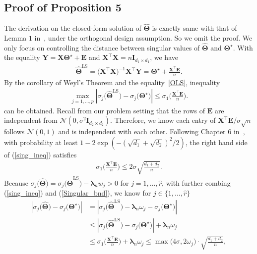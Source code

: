 \documentclass[alpha-refs]{wiley-article}
\begin{document}
\subsection{Proof of Proposition 5}
The derivation on the closed-form solution of $\widehat{\boldsymbol{\Theta}}$ is exactly same with that of Lemma $1$ in~\citet{yuan2007dimension}, under the orthogonal design assumption.
So we omit the proof.
We only focus on controlling the distance between singular values of $\widehat{\boldsymbol{\Theta}}$ and $\boldsymbol{\Theta}^{\star}$.
With the equality $\boldsymbol{Y}=\boldsymbol{X}\boldsymbol{\Theta}^{\star}+\boldsymbol{E}$ and $\boldsymbol{X}^{\top}\boldsymbol{X}=n\boldsymbol{I}_{d_{1} \times d_{1}}$, we have
\begin{align} \label{OLS}
    \widehat{\boldsymbol{\Theta}}^{\text{LS}}=\big(\boldsymbol{X}^{\top}\boldsymbol{X}\big)^{-1}\boldsymbol{X}^{\top}\boldsymbol{Y} = \boldsymbol{\Theta^\star} + \frac{\boldsymbol{X}^{\top}\boldsymbol{E}}{n}.
\end{align}
By the corollary of Weyl's Theorem and the equality~\eqref{OLS}, inequality
\begin{align} \label{sing_ineq}
    \max_{j=1,\dots,p}\left| \sigma_{j}\big(\widehat{\boldsymbol{\Theta}}^{\text{LS}}\big) - \sigma_{j}\big(\boldsymbol{\Theta^\star}\big) \right|
    \leq \sigma_{1}\bigg( \frac{\boldsymbol{X}^{\top}\boldsymbol{E}}{n} \bigg).
\end{align}
can be obtained. Recall from our problem setting that the rows of $\boldsymbol{E}$ are independent from $\mathcal{N}(0,\sigma^{2}\boldsymbol{I}_{d_{2} \times d_{2}})$.
Therefore, we know each entry of $\boldsymbol{X}^{\top}\boldsymbol{E}/\sigma\sqrt{n}$ follows $\mathcal{N}(0,1)$ and is independent with each other.
Following Chapter $6$ in~\cite{wainwright2019high},
with probability at least $1-2\exp(-(\sqrt{d_{1}}+\sqrt{d_{2}})^{2}/2)$, the right hand side of (\ref{sing_ineq}) satisfies
\begin{align} \label{Singular_bnd}
    \sigma_{1}\bigg( \frac{\boldsymbol{X}^{\top}\boldsymbol{E}}{n} \bigg) \leq 2\sigma \sqrt{\frac{d_{1}+d_{2}}{n}} .
\end{align}
Because $\sigma_{j}\big(\widehat{\boldsymbol{\Theta}}\big) = \sigma_{j}\big(\widehat{\boldsymbol{\Theta}}^{\text{LS}}\big)-\boldsymbol{\lambda}_{n} w_{j}>0$ for $j=1,\dots,\widehat{r}$, with further combing (\ref{sing_ineq}) and (\ref{Singular_bnd}), we know  for $j\in\{1,\dots,\widehat{r}\}$
\begin{align}
    \left| \sigma_{j}\big(\widehat{\boldsymbol{\Theta}}\big)-\sigma_{j}\big(\boldsymbol{\Theta}^{\star}\big)\right|
    &= \left|\sigma_{j}\big(\widehat{\boldsymbol{\Theta}}^{\text{LS}}\big)-\boldsymbol{\lambda}_{n}\omega_{j}
    -\sigma_{j}\big(\boldsymbol{\Theta}^{\star}\big)\right| \nonumber \\
    &\leq \left|\sigma_{j}\big(\widehat{\boldsymbol{\Theta}}^{\text{LS}}\big)
    -\sigma_{j}\big(\boldsymbol{\Theta}^{\star}\big)\right| + \boldsymbol{\lambda}_{n}\omega_{j} \nonumber \\
    &\leq \sigma_{1}\bigg( \frac{\boldsymbol{X}^{\top}\boldsymbol{E}}{n} \bigg) + \boldsymbol{\lambda}_{n}\omega_{j}
    \leq \max\big(4\sigma,2\omega_{j}\big)\cdot \sqrt{\frac{d_{1}+d_{2}}{n}},  \nonumber
\end{align}
\end{document}
